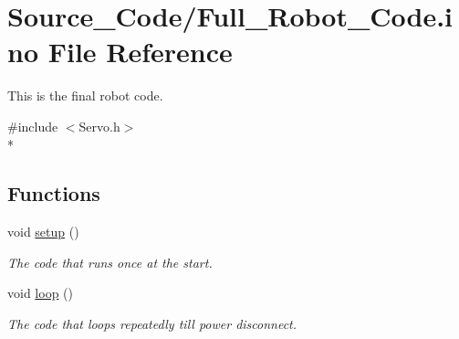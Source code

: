 \hypertarget{_full___robot___code_8ino}{\section{Source\-\_\-\-Code/\-Full\-\_\-\-Robot\-\_\-\-Code.ino File Reference}
\label{_full___robot___code_8ino}
}


This is the final robot code.  


{\ttfamily \#include $<$Servo.\-h$>$}\\*
\subsection*{Functions}
\begin{DoxyCompactItemize}
\item 
void \hyperlink{_full___robot___code_8ino_a4fc01d736fe50cf5b977f755b675f11d}{setup} ()
\begin{DoxyCompactList}\small\item\em The code that runs once at the start. \end{DoxyCompactList}\item 
void \hyperlink{_full___robot___code_8ino_afe461d27b9c48d5921c00d521181f12f}{loop} ()
\begin{DoxyCompactList}\small\item\em The code that loops repeatedly till power disconnect. \end{DoxyCompactList}\end{DoxyCompactItemize}
